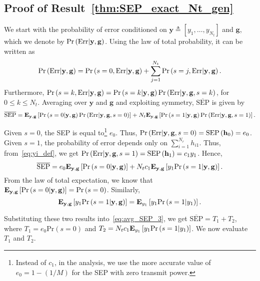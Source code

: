 \documentclass[12pt,draftcls,peerreview,onecolumn]{IEEEtran}
\newcommand{\brac}[1]{\left({#1}\right)}
\newcommand{\define}{\triangleq}
\newcommand{\explow}[2]{{\bf{E}}_{#1}\left[{#2}\right]}
\newcommand{\prob}[1]{\text{Pr}\brac{#1}}
\newcommand{\given}{\arrowvert}
\newcommand{\SEP}{\text{SEP}}
\newcommand{\y}{\mathbf{y}}
\newcommand{\nx}{{0}}
\newcommand{\Err}{{\text{Err}}}
\newcommand{\termone}{T_1}
\newcommand{\termtwo}{T_2}
\newcommand{\Nt}{{N_t}}
\newcommand{\Nr}{{N_r}}
\newcommand{\such}{h}
\newcommand{\puch}{g}
\newcommand{\hk}[1]{{\such_{#1}}}
\newcommand{\g}{\mathbf{\puch}}
\newcommand{\cone}{c_{1}}
\newcommand{\yk}[1]{y_{#1}}
\newcommand{\zerosep}{e_0}
\newcommand{\avgSEP}{\overline{\SEP}}
\newcommand{\sumnr}{\sum_{i=1}^{\Nr}}
\begin{document}
\subsection{Proof of Result~\ref{thm:SEP_exact_Nt_gen}}
\label{proof:SEP_exact_Nt_gen}
We start with the probability of error conditioned on $\y \define [\yk{1},\ldots,\yk{\Nt}]$  and $\g$, which we denote by $\prob{\Err \given \y,\g}$. Using the law of total probability, it can be written as
%
\begin{equation}
\prob{\Err \given \y,\g} =  \prob{s=\nx,\Err\given\y,\g} + \sum_{j=1}^{\Nt}\prob{s=j,\Err\given\y,\g}.
\label{eq:Perr_all_h}
\end{equation}
%
Furthermore, $\prob{s=k,\Err\given\y,\g}=\prob{s=k\given\y,\g}\prob{\Err\given\y,\g,s=k}$, for $0\leq k \leq \Nt$. Averaging over $\y$ and $\g$ and exploiting symmetry, $\avgSEP$ is given by
\begin{equation*}
\label{eq:avg_SEP_1}
 \avgSEP = \explow{\y,\g}{\prob{s=\nx\given\y,\g}\prob{\Err\given\y,\g,s=\nx}} + \Nt\explow{\y,\g}{\prob{s=1\given\y,\g}\prob{\Err\given\y,\g,s=1}}. 
\end{equation*}

Given $s=0$, the SEP is equal to\footnote{Instead of $c_1$, in the analysis,  we use the more accurate value of $\zerosep=1-\left( 1/M\right) $ for the SEP with zero transmit power.} $\zerosep$. Thus, $\prob{\Err\given\y,\g,s=\nx}=\SEP\left(\bhk{0}\right)=\zerosep$. Given $s=1$, the probability
of error depends only on $\sumnr\hk{i1}$. Thus, from~\eqref{eq:yi_def}, we get $\prob{\Err\given\y,\g,s=1}=\SEP\left(\bhk{1}\right) =\cone \yk{1}$. Hence,
%
\begin{equation}
\label{eq:avg_SEP_3}
\avgSEP  = \zerosep \explow{\y,\g}{\prob{s=\nx\given\y,\g}} + \Nt\cone\explow{\y,\g}{\yk{1}\prob{s=1\given\y,\g}}.
\end{equation}
%
From the law of total expectation, we know that $\explow{\y,\g}{\prob{s=\nx\given\y,\g}} = \prob{s = 0}$.
Similarly, 
\begin{equation}
\label{eq:avg_sep_3_one}
\explow{\y,\g}{\yk{1}\prob{s = 1\given \y,\g} } = \explow{\yk{1}}{\yk{1} \prob{s = 1\given \yk{1}}  }.
\end{equation}

Substituting these two results into~\eqref{eq:avg_SEP_3}, we get
%
$\avgSEP  = \termone + \termtwo$,
%
where $\termone=\zerosep \prob{s = 0}$ and $\termtwo=\Nt\cone \explow{\yk{1}}{ \yk{1}\prob{s = 1\given \yk{1}}}$. We now evaluate $\termone$ and $\termtwo$.
\end{document}
